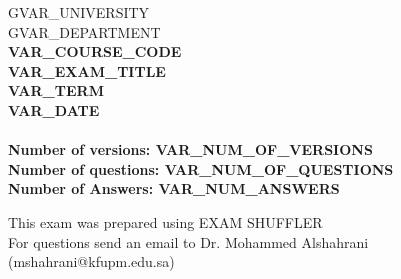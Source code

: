 \thispagestyle{empty}

\begin{center}
    \begin{large}
        GVAR_UNIVERSITY\\ %
        GVAR_DEPARTMENT\\ %
        \vspace*{2cm}
        {\bf VAR_COURSE_CODE}  \\
        {\bf VAR_EXAM_TITLE}  \\
        {\bf VAR_TERM}  \\
        {\bf VAR_DATE }  \\ %

        \vspace*{3cm}
        {\bf{\Huge{}}}\\
        \vspace*{2cm}
        {\bf Number of versions: VAR_NUM_OF_VERSIONS }  \\
        {\bf Number of questions: VAR_NUM_OF_QUESTIONS }  \\
        {\bf Number of Answers: VAR_NUM_ANSWERS}  \\
    \end{large}
    \vfill

    \tiny{This exam was prepared using EXAM SHUFFLER\\}
    \tiny{For questions send an email to Dr. Mohammed Alshahrani (mshahrani@kfupm.edu.sa)\\}

\end{center}

\newpage
